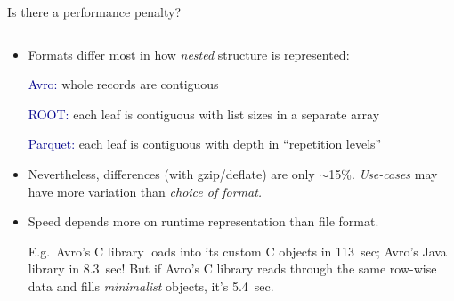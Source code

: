 \documentclass{beamer}
\begin{document}
\begin{frame}{Is there a performance penalty?}
\vspace{0.35 cm}
\begin{columns}
\begin{column}{0.55\linewidth}
\begin{itemize}
\item<1-> Formats differ most in how {\it nested} structure is represented:
\small

\vspace{0.1 cm}
\textcolor{darkblue}{Avro:} whole records are contiguous

\textcolor{darkblue}{ROOT:} each leaf is contiguous with list sizes in a separate array

\textcolor{darkblue}{Parquet:} each leaf is contiguous with depth in ``repetition levels''

\normalsize
\item<2-> Nevertheless, differences (with gzip/deflate) are only $\sim$15\%. {\it Use-cases} may have more variation than {\it choice of format.}

\item<3-> Speed depends more on runtime representation than file format.

\scriptsize
\vspace{0.1 cm}
E.g.\ Avro's C library loads into its custom C objects in 113~sec; Avro's Java library in 8.3~sec! But if Avro's C library reads through the same row-wise data and fills {\it minimalist} objects, it's 5.4~sec.


\end{itemize}
\end{column}
\end{columns}
\end{frame}
\end{document}
